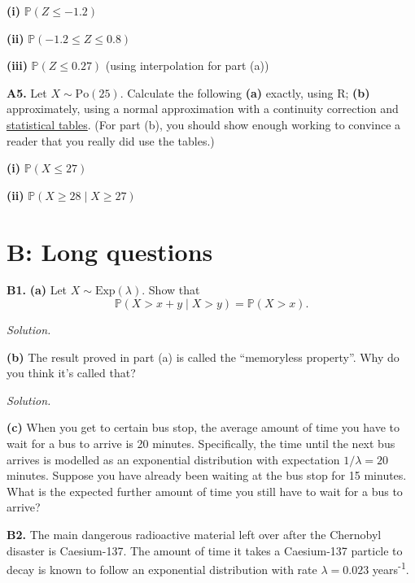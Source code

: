 \documentclass[
  a4paper,
]{book}
\theoremstyle{definition}
\theoremstyle{definition}
\theoremstyle{definition}
\theoremstyle{definition}
\theoremstyle{remark}
\begin{document}
\textbf{(i)} \(\mathbb P(Z \leq -1.2)\)

\textbf{(ii)} \(\mathbb P(-1.2 \leq Z \leq 0.8)\)

\textbf{(iii)} \(\mathbb P(Z \leq 0.27)\) (using interpolation for part (a))

\textbf{A5.} Let \(X \sim \mathrm{Po}(25)\). Calculate the following \textbf{(a)} exactly, using R; \textbf{(b)} approximately, using a normal approximation with a continuity correction and \href{https://mpaldridge.github.io/math1710/stat-tab.pdf}{statistical tables}. (For part (b), you should show enough working to convince a reader that you really did use the tables.)

\textbf{(i)} \(\mathbb P(X \leq 27)\)

\textbf{(ii)} \(\mathbb P(X \geq 28 \mid X \geq 27)\)

\hypertarget{P5-long}{%
\section*{B: Long questions}\label{P5-long}}

\textbf{B1.}
\textbf{(a)} Let \(X \sim \text{Exp}(\lambda)\). Show that
\[ \mathbb P(X > x + y \mid X > y) = \mathbb P(X > x) . \]

\begin{myanswers}
\emph{Solution.}

\end{myanswers}

\textbf{(b)} The result proved in part (a) is called the ``memoryless property''. Why do you think it's called that?

\begin{myanswers}
\emph{Solution.}

\end{myanswers}

\textbf{(c)} When you get to certain bus stop, the average amount of time you have to wait for a bus to arrive is 20 minutes. Specifically, the time until the next bus arrives is modelled as an exponential distribution with expectation \(1/\lambda = 20\) minutes. Suppose you have already been waiting at the bus stop for 15 minutes. What is the expected further amount of time you still have to wait for a bus to arrive?

\textbf{B2.} The main dangerous radioactive material left over after the Chernobyl disaster is Caesium-137. The amount of time it takes a Caesium-137 particle to decay is known to follow an exponential distribution with rate \(\lambda = 0.023\) years\textsuperscript{-1}.
\end{document}
